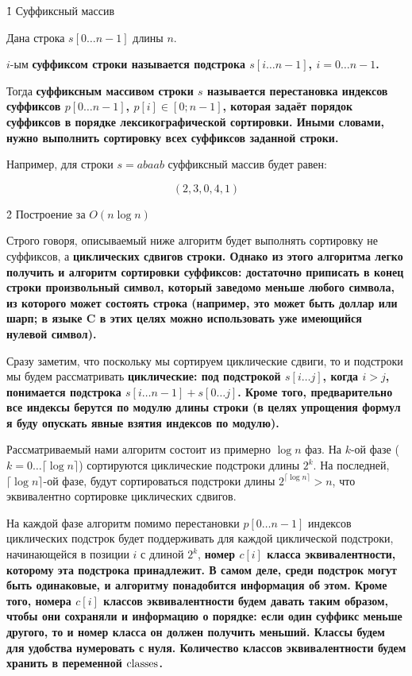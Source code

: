 \h1{ Суффиксный массив }

Дана строка $s[0 \ldots n-1]$ длины $n$.

$i$-ым \bf{суффиксом} строки называется подстрока $s[i \ldots n-1]$, $i=0 \ldots n-1$.

Тогда \bf{суффиксным массивом} строки $s$ называется перестановка индексов суффиксов $p[0 \ldots n-1]$, $p[i] \in [0;n-1]$, которая задаёт порядок суффиксов в порядке лексикографической сортировки. Иными словами, нужно выполнить сортировку всех суффиксов заданной строки.

Например, для строки $s=abaab$ суффиксный массив будет равен:

$$ (2,3,0,4,1) $$


\h2{ Построение за $O (n \log n)$ }

Строго говоря, описываемый ниже алгоритм будет выполнять сортировку не суффиксов, а \bf{циклических сдвигов} строки. Однако из этого алгоритма легко получить и алгоритм сортировки суффиксов: достаточно приписать в конец строки произвольный символ, который заведомо меньше любого символа, из которого может состоять строка (например, это может быть доллар или шарп; в языке C в этих целях можно использовать уже имеющийся нулевой символ).

Сразу заметим, что поскольку мы сортируем циклические сдвиги, то и подстроки мы будем рассматривать \bf{циклические}: под подстрокой $s[i \ldots j]$, когда $i > j$, понимается подстрока $s[i \ldots n-1] + s[0 \ldots j]$. Кроме того, предварительно все индексы берутся по модулю длины строки (в целях упрощения формул я буду опускать явные взятия индексов по модулю).

Рассматриваемый нами алгоритм состоит из примерно $\log n$ фаз. На $k$-ой фазе ($k = 0 \ldots \lceil \log n \rceil$) сортируются циклические подстроки длины $2^k$. На последней, $\lceil \log n \rceil$-ой фазе, будут сортироваться подстроки длины $2^{\lceil \log n \rceil} > n$, что эквивалентно сортировке циклических сдвигов.

На каждой фазе алгоритм помимо перестановки $p[0 \ldots n-1]$ индексов циклических подстрок будет поддерживать для каждой циклической подстроки, начинающейся в позиции $i$ с длиной $2^k$, \bf{номер $c[i]$ класса эквивалентности}, которому эта подстрока принадлежит. В самом деле, среди подстрок могут быть одинаковые, и алгоритму понадобится информация об этом. Кроме того, номера $c[i]$ классов эквивалентности будем давать таким образом, чтобы они сохраняли и информацию о порядке: если один суффикс меньше другого, то и номер класса он должен получить меньший. Классы будем для удобства нумеровать с нуля. Количество классов эквивалентности будем хранить в переменной $\rm classes$.

